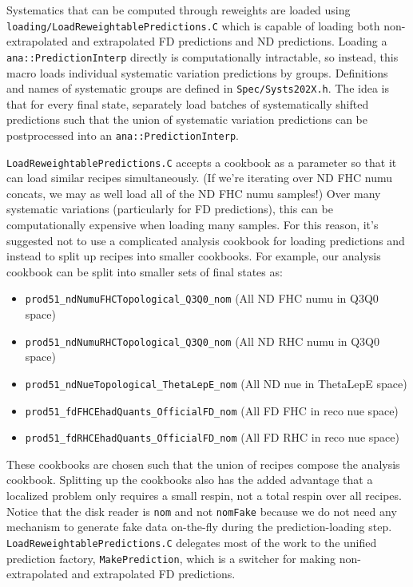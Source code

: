 \documentclass{article}
\begin{document}
Systematics that can be computed through reweights are loaded using \texttt{loading/\-Load\-Reweightable\-Predictions\-.C} which is capable of loading both non-extrapolated and extrapolated FD predictions and ND predictions. Loading a \texttt{ana::Prediction\-Interp} directly is computationally intractable, so instead, this macro loads individual systematic variation predictions by groups. Definitions and names of systematic groups are defined in \texttt{Spec/\-Systs202X\-.h}. The idea is that for every final state, separately load batches of systematically shifted predictions such that the union of systematic variation predictions can be postprocessed into an \texttt{ana::Prediction\-Interp}.

\texttt{LoadReweightablePredictions.C} accepts a cookbook as a parameter so that it can load similar recipes simultaneously. (If we're iterating over ND FHC numu concats, we may as well load all of the ND FHC numu samples!) Over many systematic variations (particularly for FD predictions), this can be computationally expensive when loading many samples. For this reason, it's suggested not to use a complicated analysis cookbook for loading predictions and instead to split up recipes into smaller cookbooks. For example, our analysis cookbook can be split into smaller sets of final states as:
\begin{itemize}
    \item \texttt{prod51\_ndNumuFHCTopological\_Q3Q0\_nom} (All ND FHC numu in Q3Q0 space)
    \item \texttt{prod51\_ndNumuRHCTopological\_Q3Q0\_nom} (All ND RHC numu in Q3Q0 space)
    \item \texttt{prod51\_ndNueTopological\_ThetaLepE\_nom} (All ND nue in ThetaLepE space)
    \item \texttt{prod51\_fdFHCEhadQuants\_OfficialFD\_nom} (All FD FHC in reco nue space)
    \item \texttt{prod51\_fdRHCEhadQuants\_OfficialFD\_nom} (All FD RHC in reco nue space)
\end{itemize}
These cookbooks are chosen such that the union of recipes compose the analysis cookbook. Splitting up the cookbooks also has the added advantage that a localized problem only requires a small respin, not a total respin over all recipes. Notice that the disk reader is \texttt{nom} and not \texttt{nomFake} because we do not need any mechanism to generate fake data on-the-fly during the prediction-loading step. \texttt{LoadReweightablePredictions.C} delegates most of the work to the unified prediction factory, \texttt{MakePrediction}, which is a switcher for making non-extrapolated and extrapolated FD predictions.
\end{document}
